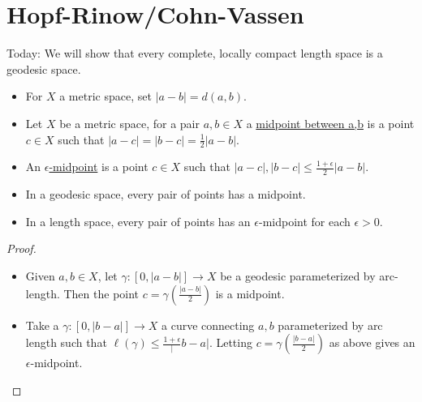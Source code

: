 \documentclass[12pt]{amsart}
\begin{document}
\section{Hopf-Rinow/Cohn-Vassen}
Today: We will show that every complete, locally compact length space is a geodesic space.\\
\begin{definition}
\begin{itemize}
    \item For $X$ a metric space, set $|a-b|=d(a,b)$.
    \item Let $X$ be a metric space, for a pair $a,b\in X$ a \underline{midpoint between a,b} is a point $c\in X$ such that $|a-c|=|b-c|=\frac{1}{2}|a-b|$.
    \item An \underline{$\epsilon$-midpoint} is a point $c\in X$ such that $|a-c|,|b-c|\le \frac{1+\epsilon}{2}|a-b|$.
\end{itemize}
\end{definition}

\begin{proposition}
\begin{itemize}
    \item In a geodesic space, every pair of points has a midpoint.\\
    \item In a length space, every pair of points has an $\epsilon$-midpoint for each $\epsilon>0$.
\end{itemize}
\end{proposition}

\begin{proof}
\begin{itemize}
    \item Given $a,b\in X$, let $\gamma:[0,|a-b|]\rightarrow X$ be a geodesic parameterized by arc-length. Then the point $c=\gamma(\frac{|a-b|}{2})$ is a midpoint.
    \item Take a $\gamma:[0,|b-a|]\rightarrow X$ a curve connecting $a,b$ parameterized by arc length such that $\ell(\gamma)\le \frac{1+\epsilon}|b-a|$. Letting $c=\gamma(\frac{|b-a|}{2})$ as above gives an $\epsilon$-midpoint.
\end{itemize}
\end{proof}
\end{document}
